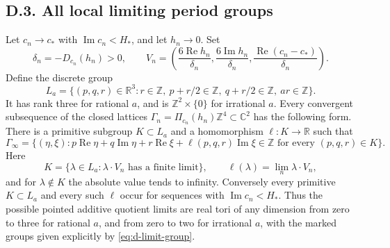 \subsection{D.3. All local limiting period groups}

\begin{theorem}[D.3.1; Proved]
Let \(c_n\to c_*\) with \(\operatorname{Im}c_n<H_*\), and let
\(h_n\to0\). Set
\[
 \delta_n=-D_{c_n}(h_n)>0,\qquad
 V_n=\left(\frac{6\operatorname{Re}h_n}{\delta_n},
           \frac{6\operatorname{Im}h_n}{\delta_n},
           \frac{\operatorname{Re}(c_n-c_*)}{\delta_n}\right).
\]
Define the discrete group
\[
 L_a=\{(p,q,r)\in\mathbb R^3:
    r\in\mathbb Z,\ p+r/2\in\mathbb Z,
    \ q+r/2\in\mathbb Z,\ ar\in\mathbb Z\}.
\]
It has rank three for rational \(a\), and is
\(\mathbb Z^2\times\{0\}\) for irrational \(a\).
Every convergent subsequence of the closed lattices
\(\Gamma_n=\Pi_{c_n}(h_n)\mathbb Z^4\subset\mathbb C^2\) has the
following form. There is a primitive subgroup \(K\subset L_a\) and
a homomorphism \(\ell:K\to\mathbb R\) such that
\begin{equation}\label{eq:d-limit-group}
 \Gamma_\infty=
 \{(\eta,\xi):p\operatorname{Re}\eta+q\operatorname{Im}\eta
       +r\operatorname{Re}\xi+\ell(p,q,r)\operatorname{Im}\xi
       \in\mathbb Z\text{ for every }(p,q,r)\in K\}.
\end{equation}
Here
\[
 K=\{\lambda\in L_a:\lambda\cdot V_n
                      \text{ has a finite limit}\},\qquad
 \ell(\lambda)=\lim_n\lambda\cdot V_n,
\]
and for \(\lambda\notin K\) the absolute value tends to infinity.
Conversely every primitive \(K\subset L_a\) and every such
\(\ell\) occur for sequences with \(\operatorname{Im}c_n<H_*\).
Thus the possible pointed additive quotient limits are real tori of
any dimension from zero to three for rational \(a\), and from zero
to two for irrational \(a\), with the marked groups given explicitly
by \eqref{eq:d-limit-group}.
\end{theorem}
